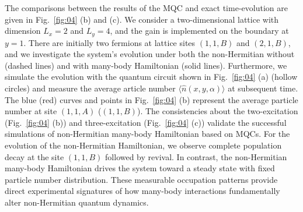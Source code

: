 \documentclass[longbibliography, aps, prx, amsmath, amssymb, amsfonts, twocolumn,superscriptaddress, footinbib]{revtex4-1}
\begin{document}
	The comparisons between the results of the MQC and exact time-evolution are given in Fig.~\ref{fig:04} (b) and (c). 
	We consider a two-dimensional lattice with dimension $L_x=2$ and $L_y=4$, and the gain is implemented on the boundary at $y=1$. 
	There are initially two fermions at lattice sites $(1,1,B)$ and $(2,1,B)$, %
    and we investigate the system's evolution under both the non-Hermitian without (dashed lines) and with many-body Hamiltonian (solid lines). Furthermore, we simulate the evolution with the quantum circuit shown in Fig.~\ref{fig:04} (a) (hollow circles) and measure the average article number $\langle \hat{n}(x,y,\alpha)\rangle$ at subsequent time. The blue (red) curves and points in Fig.~\ref{fig:04} (b) represent the average particle number at site $(1,1,A)$ ($(1,1,B)$).
	The consistencies about the two-excitation (Fig.~\ref{fig:04} (b)) and three-excitation (Fig.~\ref{fig:04} (c)) validate the successful simulations of non-Hermitian many-body Hamiltonian based on MQCs. 
	For the evolution of the non-Hermitian Hamiltonian, we observe complete population decay at the site $(1,1,B)$ followed by revival.
	In contrast, the non-Hermitian many-body Hamiltonian drives the system toward a steady state with fixed particle number distribution.
	These measurable occupation patterns provide direct experimental signatures of how many-body interactions fundamentally alter non-Hermitian quantum dynamics.
\end{document}
